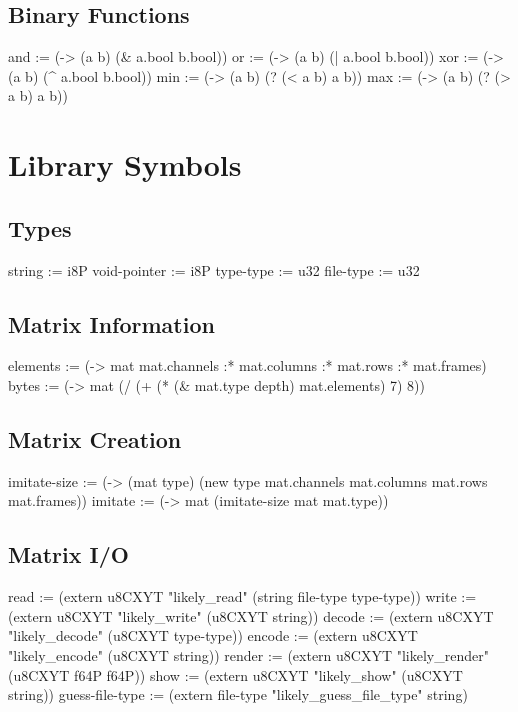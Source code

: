 \documentclass[numbers=noenddot]{scrbook}
\newenvironment{likely}
{ \verbatim }
{ \endverbatim }
\begin{document}
\section{Binary Functions}
\begin{likely}
and := (-> (a b) (& a.bool b.bool))
or  := (-> (a b) (| a.bool b.bool))
xor := (-> (a b) (^ a.bool b.bool))
min := (-> (a b) (? (< a b) a b))
max := (-> (a b) (? (> a b) a b))
\end{likely}

\chapter{Library Symbols}
\section{Types}
\begin{likely}
string := i8P
void-pointer := i8P
type-type := u32
file-type := u32
\end{likely}

\section{Matrix Information}
\begin{likely}
elements := (-> mat mat.channels :* mat.columns :* mat.rows :* mat.frames)
bytes    := (-> mat (/ (+ (* (& mat.type depth) mat.elements) 7) 8))
\end{likely}

\section{Matrix Creation}
\begin{likely}
imitate-size := (-> (mat type) (new type mat.channels mat.columns mat.rows mat.frames))
imitate := (-> mat (imitate-size mat mat.type))
\end{likely}

\section{Matrix I/O}
\begin{likely}
read   := (extern u8CXYT "likely_read" (string file-type type-type))
write  := (extern u8CXYT "likely_write" (u8CXYT string))
decode := (extern u8CXYT "likely_decode" (u8CXYT type-type))
encode := (extern u8CXYT "likely_encode" (u8CXYT string))
render := (extern u8CXYT "likely_render" (u8CXYT f64P f64P))
show   := (extern u8CXYT "likely_show" (u8CXYT string))
guess-file-type := (extern file-type "likely_guess_file_type" string)
\end{likely}
\end{document}
